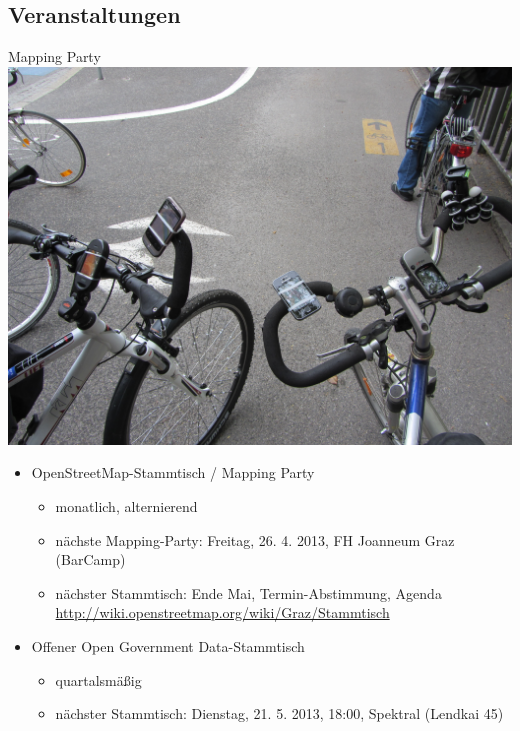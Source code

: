 \documentclass{beamer}
\begin{document}
\subsection{Veranstaltungen}
\begin{frame}{Mapping Party}
\includegraphics[width=.9\textwidth]{IMG_2250.JPG}
\end{frame}

\begin{frame}
  \begin{itemize}
    \item OpenStreetMap-Stammtisch / Mapping Party
    \begin{itemize}
      \item monatlich, alternierend
      \item nächste Mapping-Party: Freitag, 26. 4. 2013, FH Joanneum
        Graz (BarCamp)
      \item nächster Stammtisch: Ende Mai, Termin-Abstimmung, Agenda \url{http://wiki.openstreetmap.org/wiki/Graz/Stammtisch}
    \end{itemize}
    \item Offener Open Government Data-Stammtisch
    \begin{itemize}
      \item quartalsmäßig
      \item nächster Stammtisch: Dienstag, 21. 5. 2013, 18:00, Spektral (Lendkai 45)
    \end{itemize}
  \end{itemize}
\end{frame}
\end{document}

